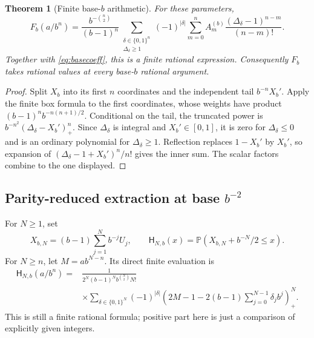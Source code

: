 \documentclass[11pt,oneside]{article}
\newtheorem{theorem}{Theorem}[section]
\theoremstyle{definition}\newtheorem{definition}[theorem]{Definition}
\theoremstyle{remark}\newtheorem{remark}[theorem]{Remark}
\newcommand{\Prob}{\mathbb P}\newcommand{\Up}{\operatorname{up}}
\begin{document}
\begin{theorem}[Finite base-$b$ arithmetic]
\label{thm:basearithmetic}
For these parameters,
\begin{equation}
 \boxed{\displaystyle
 F_b(a/b^n)=\frac{b^{-\binom n2}}{(b-1)^n}
 \sum_{\substack{\delta\in\{0,1\}^n\\\Delta_\delta\ge1}}
 (-1)^{|\delta|}
 \sum_{m=0}^{n}A_m^{(b)}\frac{(\Delta_\delta-1)^{n-m}}{(n-m)!}.}
 \label{eq:basevalue}
\end{equation}
Together with \eqref{eq:basecoeff}, this is a finite rational expression.
Consequently $F_b$ takes rational values at every base-$b$ rational argument.
\end{theorem}
\begin{proof}
Split $X_b$ into its first $n$ coordinates and the independent tail
$b^{-n}X_b'$. Apply the finite box formula to the first coordinates,
whose weights have product $(b-1)^n b^{-n(n+1)/2}$. Conditional on the
tail, the truncated power is $b^{-n^2}(\Delta_\delta-X_b')_+^n$.
Since $\Delta_\delta$ is integral and $X_b'\in[0,1]$, it is zero for
$\Delta_\delta\le0$ and is an ordinary polynomial for
$\Delta_\delta\ge1$. Reflection replaces $1-X_b'$ by $X_b'$, so expansion
of $(\Delta_\delta-1+X_b')^n/n!$ gives the inner sum.
The scalar factors combine to the one displayed.
\end{proof}

\subsection{Parity-reduced extraction at \texorpdfstring{base $b^{-2}$}{base b to the power -2}}
For $N\ge1$, set
\[
 X_{b,N}=(b-1)\sum_{j=1}^N b^{-j}U_j,
 \qquad \mathsf H_{N,b}(x)=\Prob(X_{b,N}+b^{-N}/2\le x).
\]
For $N\ge n$, let $M=ab^{N-n}$. Its direct finite evaluation is
\begin{equation}
 \begin{split}
 \mathsf H_{N,b}(a/b^n)
 ={}&\frac{1}{2^N(b-1)^N b^{\binom N2}N!}\\
 &\times\sum_{\delta\in\{0,1\}^N}(-1)^{|\delta|}
 \left(2M-1-2(b-1)\sum_{j=0}^{N-1}\delta_jb^j\right)_+^N.
 \end{split}
 \label{eq:basespline}
\end{equation}
This is still a finite rational formula; positive part here is just a
comparison of explicitly given integers.
\end{document}
